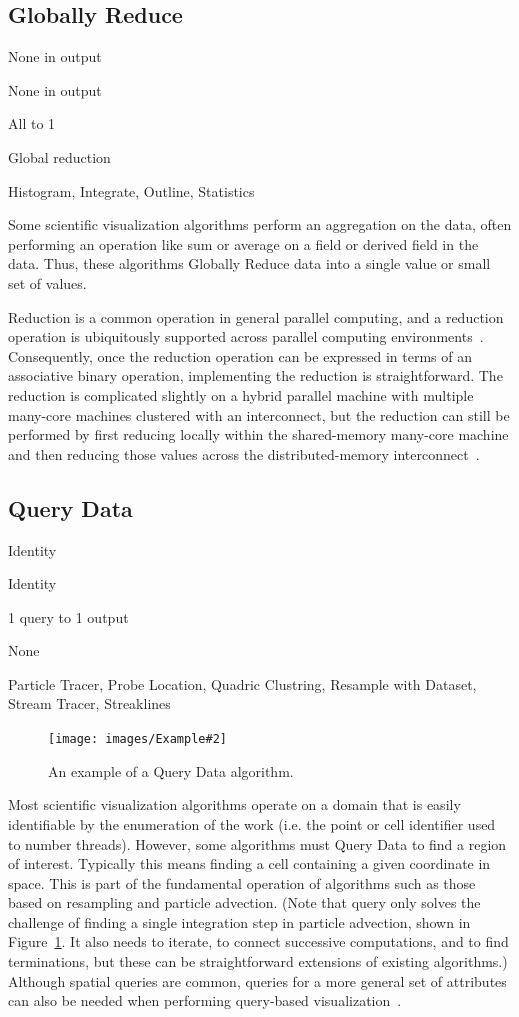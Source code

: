 \documentclass{sig-alternate}
\newcommand*{\lcite}[1]{~\cite{#1}}
\newcommand{\algclass}[1]{\textsf{#1}}
\newcommand{\algorithmclasssection}[1]{\subsection*{#1}}
\newcommand{\algorithmclass}[6]{
  \algorithmclasssection{#1} %
  \begin{description}[leftmargin=9em,style=nextline,noitemsep]
    \raggedright
  \item[Point Mapping] #2
  \item[Cell Mapping] #3
  \item[Field Mapping] #4
  \item[Collective Work] #5
  \item[Algorithms] #6
  \end{description}
}
\newcommand{\exampleimage}[2][.24]{\texttt{[image: images/Example\#2]}}
\begin{document}
\algorithmclass{Globally Reduce}
               {None in output} %
               {None in output} %
               {All to 1} %
               {Global reduction} %
               {
                 Histogram,
                 Integrate,
                 Outline,
                 Statistics
               }

\noindent
Some scientific visualization algorithms perform an aggregation on the
data, often performing an operation like sum or average on a field or
derived field in the data. Thus, these algorithms \algclass{Globally
  Reduce} data into a single value or small set of values.

Reduction is a common operation in general parallel computing, and a
reduction operation is ubiquitously supported across parallel computing
environments\lcite{MPI,Sanders2011,Thrust,TBB,Quinn2004}. Consequently,
once the reduction operation can be expressed in terms of an associative
binary operation, implementing the reduction is straightforward. The
reduction is complicated slightly on a hybrid parallel machine with
multiple many-core machines clustered with an interconnect, but the
reduction can still be performed by first reducing locally within the
shared-memory many-core machine and then reducing those values across the
distributed-memory interconnect\lcite{Dinan2010}.


\algorithmclass{Query Data}
               {Identity} %
               {Identity} %
               {1 query to 1 output} %
               {None} %
               {
                 Particle Tracer,
                 Probe Location,
                 Quadric Clustring,
                 Resample with Dataset,
                 Stream Tracer,
                 Streaklines
               }

\begin{figure}[b]
  \centering
  \exampleimage[.4]{StreamTracer}
  \caption{An example of a \algclass{Query Data} algorithm.}
  \label{fig:QueryData}
\end{figure}

\noindent
Most scientific visualization algorithms operate on a domain that is easily
identifiable by the enumeration of the work (i.e. the point or cell
identifier used to number threads). However, some algorithms must
\algclass{Query Data} to find a region of interest. Typically this means
finding a cell containing a given coordinate in space. This is part of the
fundamental operation of algorithms such as those based on resampling and
particle advection. (Note that query only solves the challenge of finding a
single integration step in particle advection, shown in
Figure~\ref{fig:QueryData}. It also needs to iterate, to connect successive
computations, and to find terminations, but these can be straightforward
extensions of existing algorithms.) Although spatial queries are common,
queries for a more general set of attributes can also be needed when
performing query-based
visualization\lcite{Glatter2008,Gosink2008,Johnson2009,Rubel2008}.
\end{document}
